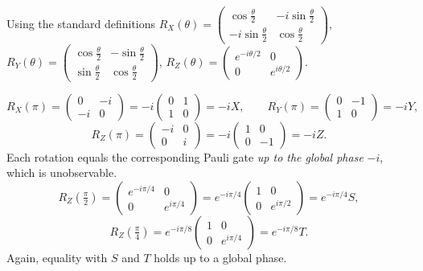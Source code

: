\documentclass{ceri/sty/rapport}
\begin{document}
\begin{solution}
Using the standard definitions
$R_X(\theta)=\begin{pmatrix}\cos\frac{\theta}{2}&-i\sin\frac{\theta}{2}\\-i\sin\frac{\theta}{2}&\cos\frac{\theta}{2}\end{pmatrix}$,
$R_Y(\theta)=\begin{pmatrix}\cos\frac{\theta}{2}&-\sin\frac{\theta}{2}\\\sin\frac{\theta}{2}&\cos\frac{\theta}{2}\end{pmatrix}$,
$R_Z(\theta)=\begin{pmatrix}e^{-i\theta/2}&0\\0&e^{i\theta/2}\end{pmatrix}$.

\[
  R_X(\pi)=\begin{pmatrix}0&-i\\-i&0\end{pmatrix}=-i\begin{pmatrix}0&1\\1&0\end{pmatrix}=-iX,\qquad
  R_Y(\pi)=\begin{pmatrix}0&-1\\1&0\end{pmatrix}=-iY,
\]
\[
  R_Z(\pi)=\begin{pmatrix}-i&0\\0&i\end{pmatrix}=-i\begin{pmatrix}1&0\\0&-1\end{pmatrix}=-iZ.
\]
Each rotation equals the corresponding Pauli gate \emph{up to the global phase} $-i$, which is unobservable.
\[
  R_Z\!\left(\tfrac{\pi}{2}\right)
    =\begin{pmatrix}e^{-i\pi/4}&0\\0&e^{i\pi/4}\end{pmatrix}
    =e^{-i\pi/4}\begin{pmatrix}1&0\\0&e^{i\pi/2}\end{pmatrix}
    =e^{-i\pi/4}S,
\]
\[
  R_Z\!\left(\tfrac{\pi}{4}\right)
    =e^{-i\pi/8}\begin{pmatrix}1&0\\0&e^{i\pi/4}\end{pmatrix}
    =e^{-i\pi/8}T.
\]
Again, equality with $S$ and $T$ holds up to a global phase.
\end{solution}
\end{document}
